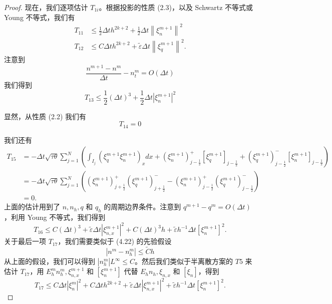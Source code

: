 \begin{proof}
    现在，我们逐项估计 $T_{1 i}$。根据投影的性质 (2.3)，以及 Schwartz 不等式或 Young 不等式，我们有
    $$
        \begin{aligned}
            T_{11} & \leq \frac{1}{2} \Delta t h^{2 k+2}+\frac{1}{2} \Delta t\left\|\xi_{n}^{m+1}\right\|^{2} \\
            T_{12} & \leq C \Delta t h^{2 k+2}+\tilde{\varepsilon} \Delta t\left\|\xi_{q}^{m+1}\right\|^{2} .
        \end{aligned}
    $$
    注意到
    $$ \frac{n^{m+1}-n^{m}}{\Delta t}-n_{t}^{m}=O(\Delta t) $$ 我们得到 $$ T_{13} \leq \frac{1}{2}(\Delta t)^{3}+\frac{1}{2} \Delta t\left|\xi_{n}^{m+1}\right|^{2}
    $$

    显然，从性质 (2.2) 我们有 $$ T_{14}=0 $$

    我们还有 $$
        \begin{aligned}
            T_{15} & =-\Delta t \sqrt{\tau \theta} \sum_{j=1}^{N}\left(\int_{I_{j}}\left(\xi_{q}^{m+1} \xi_{n}^{m+1}\right)_{x} d x+\left(\xi_{n}^{m+1}\right)_{j-\frac{1}{2}}^{+}\left[\xi_{q}^{m+1}\right]_{j-\frac{1}{2}}+\left(\xi_{q}^{m+1}\right)_{j-\frac{1}{2}}^{-}\left[\xi_{n}^{m+1}\right]_{j-\frac{1}{2}}\right) \\
                   & =-\Delta t \sqrt{\tau \theta} \sum_{j=1}^{N}\left(\left(\xi_{n}^{m+1}\right)_{j+\frac{1}{2}}^{+}\left(\xi_{q}^{m+1}\right)_{j+\frac{1}{2}}^{-}-\left(\xi_{n}^{m+1}\right)_{j-\frac{1}{2}}^{+}\left(\xi_{q}^{m+1}\right)_{j-\frac{1}{2}}^{-}\right)                                                      \\
                   & =0 .
        \end{aligned}
    $$
    上面的估计用到了 $n, n_{h}, q$ 和 $q_{h}$ 的周期边界条件。注意到 $q^{m+1}-q^{m}=O(\Delta t)$，利用 Young 不等式，我们得到
    $$ T_{16} \leq C(\Delta t)^{3}+\tilde{\varepsilon} \Delta t\left|\xi_{n, x}^{m+1}\right|^{2}+C(\Delta t)^{3} h+\tilde{\varepsilon} h^{-1} \Delta t\left[\xi_{n}^{m+1}\right]^{2} .
    $$
    关于最后一项 $T_{17}$，我们需要类似于 (4.22) 的先验假设
    $$ \left|n^{m}-n_{h}^{m}\right| \leq \tilde{C} h $$
    从上面的假设，我们可以得到 $\left|n_{h}^{m}\right|{L^{\infty}} \leq C$。然后我们类似于半离散方案的 $T{5}$ 来估计 $T_{17}$，用 $E_{h}^{m} n_{h}^{m}, \xi_{n, x}^{m+1}$ 和 $\left[\xi_{n}^{m+1}\right]$ 代替 $E_{h} n_{h}, \xi_{n, x}$ 和 $\left[\xi_{n}\right]$，得到
    $$ T_{17} \leq C \Delta t\left|\xi_{n}^{m}\right|^{2}+C \Delta t h^{2 k+2}+\tilde{\varepsilon} \Delta t\left|\xi_{n, x}^{m+1}\right|^{2}+\tilde{\varepsilon} h^{-1} \Delta t\left[\xi_{n}^{m+1}\right]^{2} .
$$
\end{proof}
